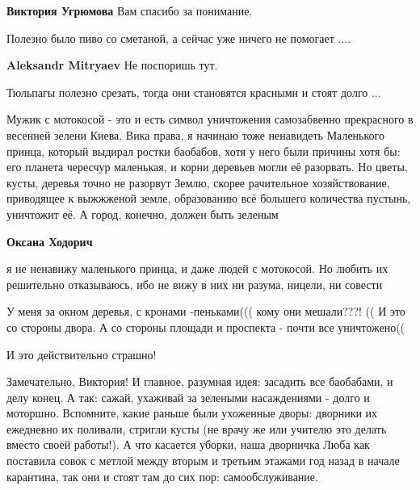 \begin{itemize}
\begin{itemize}
\begin{itemize}
\textbf{Виктория Угрюмова} Вам спасибо за понимание.
\end{itemize} %

Полезно было пиво со сметаной, а сейчас уже ничего не помогает ....

\textbf{Aleksandr Mitryaev} Не поспоришь тут.

Тюльпагы полезно срезать, тогда они становятся красными и стоят долго ...

\end{itemize} %


Мужик с мотокосой - это и есть символ уничтожения самозабвенно прекрасного в
весенней зелени Киева. Вика права, я начинаю тоже ненавидеть Маленького принца,
который выдирал ростки баобабов, хотя у него были причины хотя бы: его планета
чересчур маленькая, и корни деревьев могли её разорвать. Но цветы, кусты,
деревья точно не разорвут Землю, скорее рачительное хозяйствование, приводящее
к выжжженой земле, образованию всё большего количества пустынь, уничтожит её. А
город, конечно, должен быть зеленым

\begin{itemize} %
\textbf{Оксана Ходорич} 

я не ненавижу маленького принца, и даже людей с мотокосой. Но любить их
решительно отказываюсь, ибо не вижу в них ни разума, ницели, ни совести
\end{itemize} %


У меня за окном деревья, с кронами -пеньками((( кому они мешали???! (( И это со
стороны двора. А со стороны площади и проспекта - почти все уничтожено((


И это действительно страшно!


Замечательно, Виктория! И главное, разумная идея: засадить все баобабами, и
делу конец. А так: сажай, ухаживай за зелеными насаждениями - долго и моторшно.
Вспомните, какие раньше были ухоженные дворы: дворники их ежедневно их
поливали, стригли кусты (не врачу же или учителю это делать вместо своей
работы!). А что касается уборки, наша дворничка Люба как поставила совок с
метлой между вторым и третьим этажами год назад в начале карантина, так они и
стоят там до сих пор: самообслуживание.


\end{itemize}
